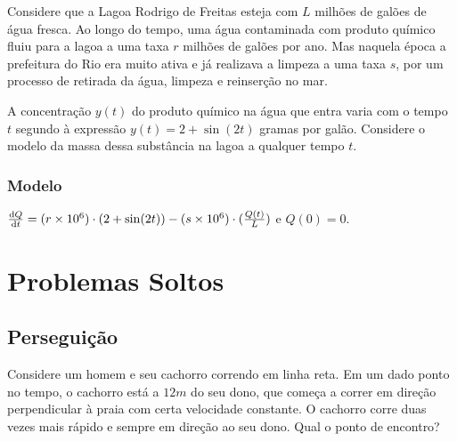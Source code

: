 \documentclass[12pt]{article}
\begin{document}
Considere que a Lagoa Rodrigo de Freitas esteja com $L$ milhões de galões de
água fresca. Ao longo do tempo, uma água contaminada com produto químico fluiu
para a lagoa a uma taxa $r$ milhões de galões por ano. Mas naquela época a
prefeitura do Rio era muito ativa e já realizava a limpeza a uma taxa $s$, por
um processo de retirada da água, limpeza e reinserção no mar. 

A concentração $y(t)$ do produto químico na água que entra varia com o tempo $t$ segundo
à expressão $y(t) = 2 + \sin (2t)$ gramas por galão. Considere o modelo da
massa dessa substância na lagoa a qualquer tempo $t$. 


\subsubsection{Modelo}

$\dv{Q}{t} = (r\times 10^6)\cdot (2 + \sin (2t)) - (s\times 10^6)\cdot
(\frac{Q(t)}{L})$ e $Q(0) = 0$. 

\section{Problemas Soltos}

\subsection{Perseguição}

Considere um homem e seu cachorro correndo em linha reta. Em um dado ponto no
tempo, o cachorro está a $12m$ do seu dono, que começa a correr em direção
perpendicular à praia com certa velocidade constante. O cachorro corre duas
vezes mais rápido e sempre em direção ao seu dono. Qual o ponto de encontro?
\end{document}
